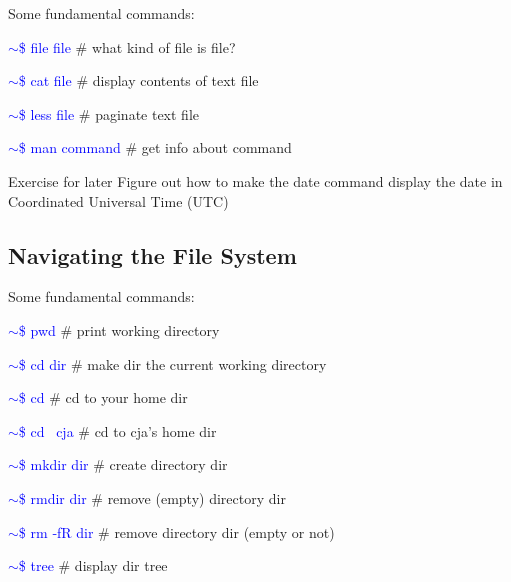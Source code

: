 \documentclass{beamer}[10pt, usepdftitle=false, handout]
\newcommand*{\blue}{\textcolor{blue}}
\begin{document}
	\begin{frame}
	
	Some fundamental commands:
	\vspace*{1em}
	
	\blue{$\sim$\$ file file} \# what kind of file is file?
	
	\blue{$\sim$\$ cat file} \# display contents of text file
	
	\blue{$\sim$\$ less file} \# paginate text file
	
	\blue{$\sim$\$ man command} \# get info about command
	
	\vspace*{1em}	
	
	\begin{block}{Exercise for later}
	Figure out how to make the date command display the date in Coordinated Universal Time (UTC)
	\end{block} 
		
	\end{frame}
	
	\subsection{Navigating the File System}	
	
	\begin{frame}
	
	Some fundamental commands:
	\vspace*{1em}

	\blue{$\sim$\$ pwd} \# print working directory
	
	\blue{$\sim$\$ cd dir} \# make dir the current working directory

	\blue{$\sim$\$ cd} \# cd to your home dir

	\blue{$\sim$\$ cd ~cja} \# cd to cja’s home dir
	
	\blue{$\sim$\$ mkdir dir} \# create directory dir
	
	\blue{$\sim$\$ rmdir dir} \# remove (empty) directory dir

	\blue{$\sim$\$ rm ‐fR dir} \# remove directory dir (empty or not)

	\blue{$\sim$\$ tree} \# display dir tree
		
	\end{frame}	
	
\end{document}

